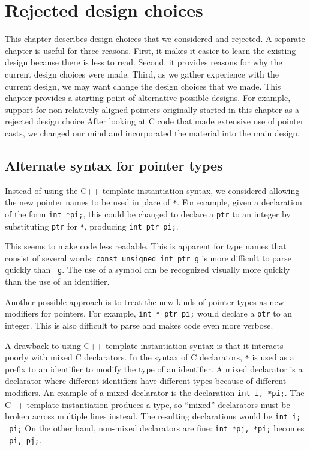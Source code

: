
\chapter{Rejected design choices}
\label{chapter:design-alternatives}

This chapter describes design choices that we considered and rejected.
A separate chapter is useful for three reasons.   First, it makes it 
easier to learn the existing design because there is less to read.
Second, it provides reasons for why the current
design choices were made.  Third, as we gather experience with the current
design, we may want change the design choices that we made. 
This chapter provides a starting point 
of alternative possible designs.  For example, support for non-relatively 
aligned pointers originally started in this chapter as a rejected design choice 
After looking at C code that
made extensive use of pointer casts, we changed our mind and incorporated
the material into the main design.

\section{Alternate syntax for pointer types}

Instead of using the C++ template instantiation syntax, we
considered allowing the new pointer names to be used in place of \texttt{*}.
For example, given a declaration of the form \texttt{int *pi;}, this could be changed
to declare a \texttt{ptr} to an integer by substituting \texttt{ptr} for \texttt{*},
producing \texttt{int ptr pi;}.
  
This seems to make code less readable.  This is apparent for type names that 
consist of several words: \texttt{const unsigned int ptr g} is more
difficult to parse quickly than \texttt{ g}.
The use of a symbol can be recognized visually more quickly than the use 
of an identifier.  

Another possible approach is to treat the new kinds
of pointer types  as new modifiers for pointers.  For example, 
\texttt{int * ptr pi;} would declare a \texttt{ptr} to an integer. This is 
also difficult to parse and makes code even more verbose.

A drawback to using C++ template instantiation syntax is that it interacts
poorly with mixed C declarators. In the syntax of C declarators, \texttt{*} is used as
a prefix to an identifier to modify the type of an identifier. A mixed
declarator is a declarator where different identifiers have different
types because of different modifiers. An example of a mixed declarator
is the declaration \texttt{int i, *pi;}. The C++ template instantiation produces a
type, so ``mixed'' declarators must be broken across multiple
lines instead. The resulting declarations would be 
\texttt{int i; \ptrint\ pi;} On the other hand, non-mixed
declarators are fine: \texttt{int *pj, *pi;} becomes
\texttt{\ptrint\ pi, pj;}.

